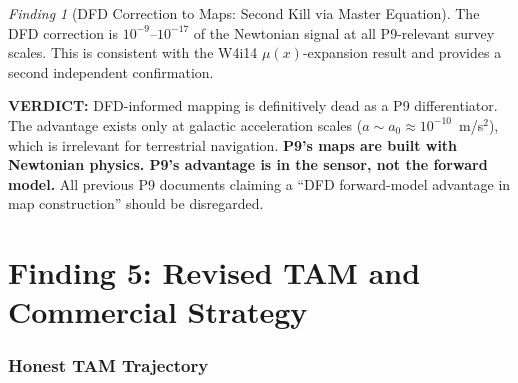 \documentclass[11pt]{article}
\theoremstyle{definition}
\theoremstyle{remark}
\newtheorem{finding}[theorem]{Finding}
\newcommand{\verdict}[1]{\textcolor{green!50!black}{\textbf{VERDICT:} #1}}
\begin{document}
\begin{finding}[DFD Correction to Maps: Second Kill via Master Equation]
The DFD correction is $10^{-9}$--$10^{-17}$ of the Newtonian signal
at all P9-relevant survey scales. This is consistent with the W4i14
$\mu(x)$-expansion result and provides a second independent confirmation.

\verdict{DFD-informed mapping is definitively dead as a P9 differentiator.
The advantage exists only at galactic acceleration scales ($a \sim a_0
\approx 10^{-10}$~m/s$^2$), which is irrelevant for terrestrial
navigation. \textbf{P9's maps are built with Newtonian physics.
P9's advantage is in the sensor, not the forward model.} All previous
P9 documents claiming a ``DFD forward-model advantage in map
construction'' should be disregarded.}
\end{finding}

\part{Finding 5: Revised TAM and Commercial Strategy}
\label{part:tam-revised}

\section{Honest TAM Trajectory}
\label{sec:tam-trajectory}
\end{document}
